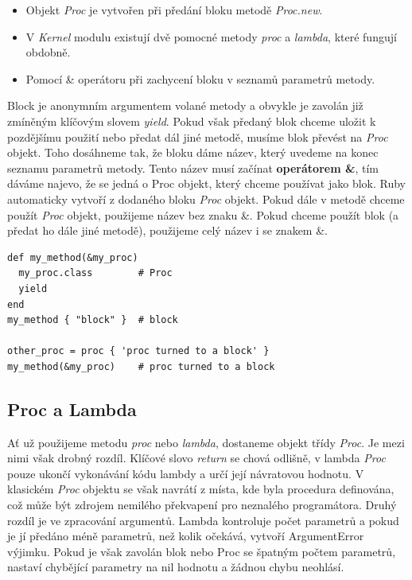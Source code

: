 \documentclass[12pt,a4paper,oneside]{article}
\begin{document}
\begin{itemize}
\item Objekt \emph{Proc} je vytvořen při předání bloku metodě \emph{Proc.new}. 
\item V \emph{Kernel} modulu existují dvě pomocné metody \emph{proc} a \emph{lambda}, které fungují obdobně.
\item Pomocí \& operátoru při zachycení bloku v seznamů parametrů metody.
\end{itemize}

Block je anonymním argumentem volané metody a obvykle je zavolán již zmíněným klíčovým slovem \emph{yield}. Pokud však předaný blok chceme uložit k pozdějšímu použití nebo předat dál jiné metodě, musíme blok převést na \emph{Proc} objekt. Toho dosáhneme tak, že bloku dáme název, který uvedeme na konec seznamu parametrů metody. Tento název musí začínat \textbf{operátorem \&}, tím dáváme najevo, že se jedná o Proc objekt, který chceme používat jako blok. Ruby automaticky vytvoří z dodaného bloku \emph{Proc} objekt. Pokud dále v metodě chceme použít \emph{Proc} objekt, použijeme název bez znaku \&. Pokud chceme použít blok (a předat ho dále jiné metodě), použijeme celý název i se znakem \&.

\begin{lstlisting}[frame=single]
def my_method(&my_proc)
  my_proc.class        # Proc
  yield
end
my_method { "block" }  # block

other_proc = proc { 'proc turned to a block' }
my_method(&my_proc)    # proc turned to a block
\end{lstlisting}


\subsection{Proc a Lambda}

Ať už použijeme metodu \emph{proc} nebo \emph{lambda}, dostaneme objekt třídy \emph{Proc}. Je mezi nimi však drobný rozdíl. Klíčové slovo \emph{return} se chová odlišně, v lambda \emph{Proc} pouze ukončí vykonávání kódu lambdy a určí její návratovou hodnotu. V klasickém \emph{Proc} objektu se však navrátí z místa, kde byla procedura definována, což může být zdrojem nemilého překvapení pro neznalého programátora. Druhý rozdíl je ve zpracování argumentů. Lambda kontroluje počet parametrů a pokud je jí předáno méně parametrů, než kolik očekává, vytvoří ArgumentError výjimku. Pokud je však zavolán blok nebo Proc se špatným počtem parametrů, nastaví chybějící parametry na nil hodnotu a žádnou chybu neohlásí.
\end{document}

